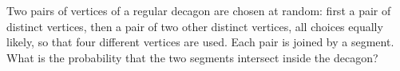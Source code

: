 Two pairs of vertices of a regular decagon are chosen at random: first a pair of distinct vertices, then a pair of two other distinct vertices, all choices equally likely, so that four different vertices are used. Each pair is joined by a segment. What is the probability that the two segments intersect inside the decagon?
